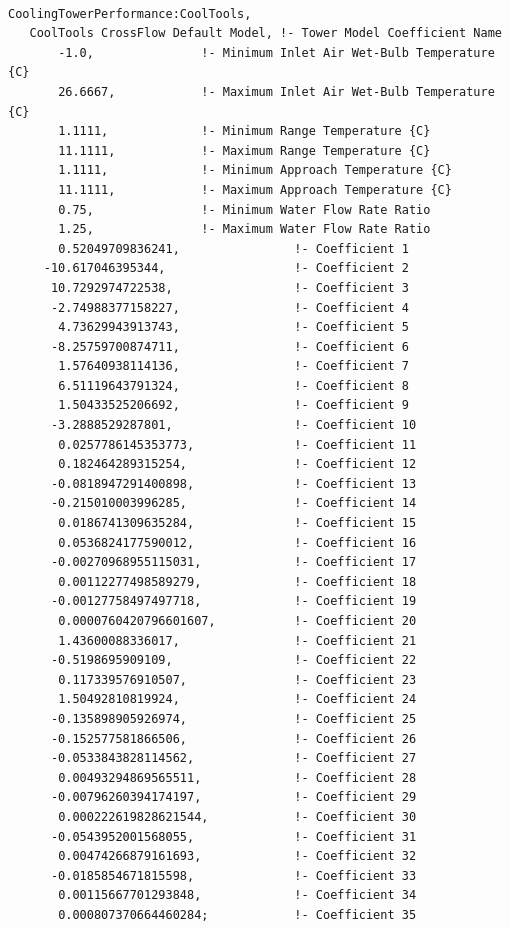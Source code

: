 \begin{lstlisting}

CoolingTowerPerformance:CoolTools,
   CoolTools CrossFlow Default Model, !- Tower Model Coefficient Name
       -1.0,               !- Minimum Inlet Air Wet-Bulb Temperature {C}
       26.6667,            !- Maximum Inlet Air Wet-Bulb Temperature {C}
       1.1111,             !- Minimum Range Temperature {C}
       11.1111,            !- Maximum Range Temperature {C}
       1.1111,             !- Minimum Approach Temperature {C}
       11.1111,            !- Maximum Approach Temperature {C}
       0.75,               !- Minimum Water Flow Rate Ratio
       1.25,               !- Maximum Water Flow Rate Ratio
       0.52049709836241,                !- Coefficient 1
     -10.617046395344,                  !- Coefficient 2
      10.7292974722538,                 !- Coefficient 3
      -2.74988377158227,                !- Coefficient 4
       4.73629943913743,                !- Coefficient 5
      -8.25759700874711,                !- Coefficient 6
       1.57640938114136,                !- Coefficient 7
       6.51119643791324,                !- Coefficient 8
       1.50433525206692,                !- Coefficient 9
      -3.2888529287801,                 !- Coefficient 10
       0.0257786145353773,              !- Coefficient 11
       0.182464289315254,               !- Coefficient 12
      -0.0818947291400898,              !- Coefficient 13
      -0.215010003996285,               !- Coefficient 14
       0.0186741309635284,              !- Coefficient 15
       0.0536824177590012,              !- Coefficient 16
      -0.00270968955115031,             !- Coefficient 17
       0.00112277498589279,             !- Coefficient 18
      -0.00127758497497718,             !- Coefficient 19
       0.0000760420796601607,           !- Coefficient 20
       1.43600088336017,                !- Coefficient 21
      -0.5198695909109,                 !- Coefficient 22
       0.117339576910507,               !- Coefficient 23
       1.50492810819924,                !- Coefficient 24
      -0.135898905926974,               !- Coefficient 25
      -0.152577581866506,               !- Coefficient 26
      -0.0533843828114562,              !- Coefficient 27
       0.00493294869565511,             !- Coefficient 28
      -0.00796260394174197,             !- Coefficient 29
       0.000222619828621544,            !- Coefficient 30
      -0.0543952001568055,              !- Coefficient 31
       0.00474266879161693,             !- Coefficient 32
      -0.0185854671815598,              !- Coefficient 33
       0.00115667701293848,             !- Coefficient 34
       0.000807370664460284;            !- Coefficient 35
\end{lstlisting}


